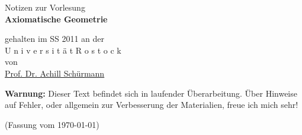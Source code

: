 \thispagestyle{empty}
\vspace*{3cm}

\begin{center}
    {\Large Notizen zur Vorlesung\\}
    \vspace{1cm}
    {\LARGE{\bf Axiomatische Geometrie}\\}
    \vspace{1.5cm}

{\Large
   gehalten im SS 2011 an der \\[1cm]
     U n i v e r s i t ä t  \quad  R o s t o c k\\[1cm]
   von \\[1cm]
    \href{http://www.geometrie.uni-rostock.de/}{Prof. Dr. Achill Schürmann}\\[1cm]
}
\end{center}

\vspace{4cm}

\noindent
{\bf Warnung:} Dieser Text befindet sich in laufender Überarbeitung.
Über Hinweise auf Fehler, oder allgemein zur Verbesserung der Materialien, freue ich mich sehr!


\noindent

(Fassung vom \today)






